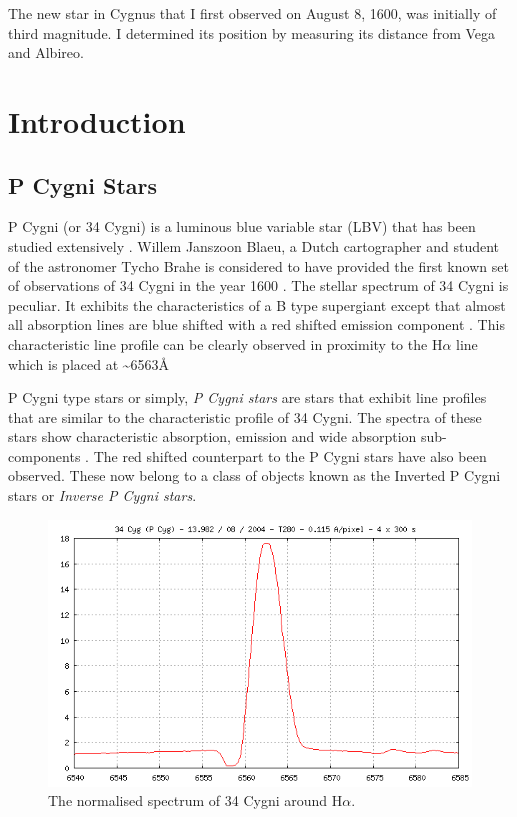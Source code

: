 \begin{savequote}[45mm]
The new star in Cygnus that I first observed on August 8, 1600, was initially of third magnitude. I determined its position by measuring its distance from Vega and Albireo.
\end{savequote}

\chapter{Introduction}

\section{P Cygni Stars}

P Cygni (or 34 Cygni) is a luminous blue variable star (LBV) that has been studied extensively \cite{1953PDAO....9....1B, hutchings1969expanding, elliott20225, underhill1966supergiants,mizumoto2018newly}. Willem Janszoon Blaeu, a Dutch cartographer and student of the astronomer Tycho Brahe is considered to have provided the first known set of observations of 34 Cygni in the year 1600 \cite{deGrootPCygni}. The stellar spectrum of 34 Cygni is peculiar. It exhibits the characteristics of a B type supergiant except that almost all absorption lines are blue shifted with a red shifted emission component \cite{hutchings1969expanding}. This characteristic line profile can be clearly observed in proximity to the H$\alpha$ line which is placed at \textasciitilde 6563\r{A} \cite{zhang2021catalog,traven2015gaia}

P Cygni type stars or simply, \emph{P Cygni stars} are stars that exhibit line profiles that are similar to the characteristic profile of 34 Cygni. The spectra of these stars show characteristic absorption, emission and wide absorption sub-components \cite{zhang2021catalog}. The red shifted counterpart to the P Cygni stars have also been observed. These now belong to a class of objects known as the Inverted P Cygni stars or \emph{Inverse P Cygni stars}. 

\begin{figure}[t]
\centering
\includegraphics[scale=.40]{figures/34cygni.png}
\caption{The normalised spectrum of 34 Cygni around H$\alpha$.}
\end{figure}

